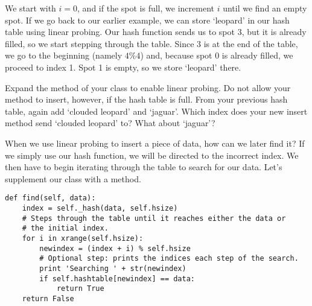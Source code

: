 We start with $i = 0$, and if the spot is full, we increment $i$ until we find an empty spot.
If we go back to our earlier example, we can store `leopard' in our hash table using linear probing.
Our hash function sends us to spot 3, but it is already filled, so we start stepping through the table.
Since 3 is at the end of the table, we go to the beginning (namely $4 \% 4$) and, because spot 0 is already filled, we proceed to index 1.
Spot 1 is empty, so we store `leopard' there.
\begin{figure}
\end{figure}
\begin{problem}
Expand the  method of your  class to enable linear probing.
Do not allow your method to insert, however, if the hash table is full.
From your previous hash table, again add `clouded leopard' and `jaguar'.
Which index does your new insert method send `clouded leopard' to?
What about `jaguar'?
\label{prob:Linear probing insert}
\end{problem}

When we use linear probing to insert a piece of data, how can we later find it?
If we simply use our hash function, we will be directed to the incorrect index.
We then have to begin iterating through the table to search for our data.
Let's supplement our  class with a  method.
\begin{lstlisting}
def find(self, data):
    index = self._hash(data, self.hsize)
    # Steps through the table until it reaches either the data or 
    # the initial index.
    for i in xrange(self.hsize):
        newindex = (index + i) % self.hsize
        # Optional step: prints the indices each step of the search.
        print 'Searching ' + str(newindex)
        if self.hashtable[newindex] == data:
            return True
    return False
\end{lstlisting}

